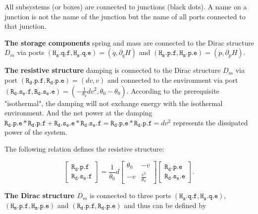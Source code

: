 \documentclass[
	parskip, 			   %
	twoside, 			   %
	DIV=14, 			   %
	BCOR=15.0mm, 		   %
	headsepline, 		   %
	open=right, 		   %
	captions=tableheading, %
	bibliography=totoc,    %
	numbers=noenddot       %
]{scrreprt}
\begin{document}
All subsystems (or boxes) are connected to junctions (black dots). A name on a junction is not the name of the junction but the name of all ports connected to that junction.

\textbf{The storage components} spring and mass are connected to the Dirac structure $D_m$ via ports $(\mathtt{H_{s}.q.f}, \mathtt{H_{s}.q.e}) = (\dot{q}, \partial_q H)$ and $(\mathtt{H_{m}.p.f}, \mathtt{H_{m}.p.e}) = (\dot{p}, \partial_p H)$.

\textbf{The resistive structure} damping is connected to the Dirac structure $D_m$ via port $(\mathtt{R_{d}.p.f}, \mathtt{R_{d}.p.e}) = (dv, v)$ and connected to the environment via port $(\mathtt{R_{d}.s_{e}.f}, \mathtt{R_{d}.s_{e}.e}) = (-\frac{1}{\theta_{0}}dv^2, \theta_{0}-\theta_{0})$. According to the prerequisite "isothermal", the damping will not exchange energy with the isothermal environment. And the net power at the damping $\mathtt{R_{d}.p.e} * \mathtt{R_{d}.p.f} + \mathtt{R_{d}.s_{e}.e} * \mathtt{R_{d}.s_{e}.f} = \mathtt{R_{d}.p.e} * \mathtt{R_{d}.p.f} = dv^2$ represents the dissipated power of the system.

The following relation defines the resistive structure:

\begin{equation}
    \label{eq:resistive_structure_idho}
    \left[\begin{array}{l}\mathtt{R_{d}.p.f} \\ \mathtt{R_{d}.s_{e}.f}\end{array}\right]=\frac{1}{\theta_0} d\left[\begin{array}{rr}\theta_0 & -v \\ -v & \frac{v^2}{\theta_0}\end{array}\right]\left[\begin{array}{l}\mathtt{R_{d}.p.e} \\ \mathtt{R_{d}.s_{e}.e}\end{array}\right].
\end{equation}

\textbf{The Dirac structure $D_m$} is connected to three ports $(\mathtt{H_{s}.q.f}, \mathtt{H_{s}.q.e})$, $(\mathtt{H_{m}.p.f}, \mathtt{H_{m}.p.e})$ and $(\mathtt{R_{d}.p.f}, \mathtt{R_{d}.p.e})$ and thus can be defined by
\end{document}
